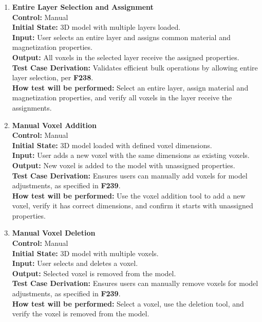 \documentclass[12pt, titlepage]{article}
\begin{document}
\begin{enumerate}
  \item \textbf{Entire Layer Selection and Assignment} \\[2mm]
    \textbf{Control:} Manual \\ 
    \textbf{Initial State:} 3D model with multiple layers loaded. \\ 
    \textbf{Input:} User selects an entire layer and assigns common material and magnetization properties. \\ 
    \textbf{Output:} All voxels in the selected layer receive the assigned properties. \\[2mm]
    \textbf{Test Case Derivation:} Validates efficient bulk operations by allowing entire layer selection, per \textbf{F238}. \\[2mm]
    \textbf{How test will be performed:} Select an entire layer, assign material and magnetization properties, and verify all voxels in the layer receive the assignments.

  \item \textbf{Manual Voxel Addition} \\[2mm]
    \textbf{Control:} Manual \\ 
    \textbf{Initial State:} 3D model loaded with defined voxel dimensions. \\ 
    \textbf{Input:} User adds a new voxel with the same dimensions as existing voxels. \\ 
    \textbf{Output:} New voxel is added to the model with unassigned properties. \\[2mm]
    \textbf{Test Case Derivation:} Ensures users can manually add voxels for model adjustments, as specified in \textbf{F239}. \\[2mm]
    \textbf{How test will be performed:} Use the voxel addition tool to add a new voxel, verify it has correct dimensions, and confirm it starts with unassigned properties.

  \item \textbf{Manual Voxel Deletion} \\[2mm]
    \textbf{Control:} Manual \\ 
    \textbf{Initial State:} 3D model with multiple voxels. \\ 
    \textbf{Input:} User selects and deletes a voxel. \\ 
    \textbf{Output:} Selected voxel is removed from the model. \\[2mm]
    \textbf{Test Case Derivation:} Ensures users can manually remove voxels for model adjustments, as specified in \textbf{F239}. \\[2mm]
    \textbf{How test will be performed:} Select a voxel, use the deletion tool, and verify the voxel is removed from the model.


\end{enumerate}
\end{document}
